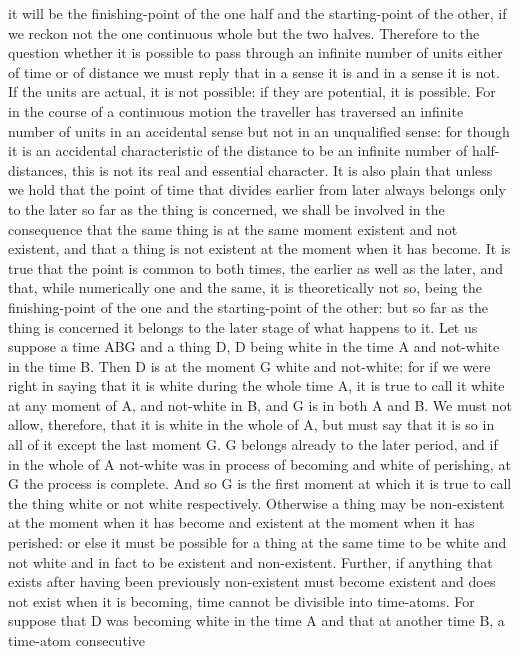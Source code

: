 it will be the finishing-point of the one half and the starting-point
of the other, if we reckon not the one continuous whole but the two
halves. Therefore to the question whether it is possible to pass through
an infinite number of units either of time or of distance we must
reply that in a sense it is and in a sense it is not. If the units
are actual, it is not possible: if they are potential, it is possible.
For in the course of a continuous motion the traveller has traversed
an infinite number of units in an accidental sense but not in an unqualified
sense: for though it is an accidental characteristic of the distance
to be an infinite number of half-distances, this is not its real and
essential character. It is also plain that unless we hold that the
point of time that divides earlier from later always belongs only
to the later so far as the thing is concerned, we shall be involved
in the consequence that the same thing is at the same moment existent
and not existent, and that a thing is not existent at the moment when
it has become. It is true that the point is common to both times,
the earlier as well as the later, and that, while numerically one
and the same, it is theoretically not so, being the finishing-point
of the one and the starting-point of the other: but so far as the
thing is concerned it belongs to the later stage of what happens to
it. Let us suppose a time ABG and a thing D, D being white in the
time A and not-white in the time B. Then D is at the moment G white
and not-white: for if we were right in saying that it is white during
the whole time A, it is true to call it white at any moment of A,
and not-white in B, and G is in both A and B. We must not allow, therefore,
that it is white in the whole of A, but must say that it is so in
all of it except the last moment G. G belongs already to the later
period, and if in the whole of A not-white was in process of becoming
and white of perishing, at G the process is complete. And so G is
the first moment at which it is true to call the thing white or not
white respectively. Otherwise a thing may be non-existent at the moment
when it has become and existent at the moment when it has perished:
or else it must be possible for a thing at the same time to be white
and not white and in fact to be existent and non-existent. Further,
if anything that exists after having been previously non-existent
must become existent and does not exist when it is becoming, time
cannot be divisible into time-atoms. For suppose that D was becoming
white in the time A and that at another time B, a time-atom consecutive
